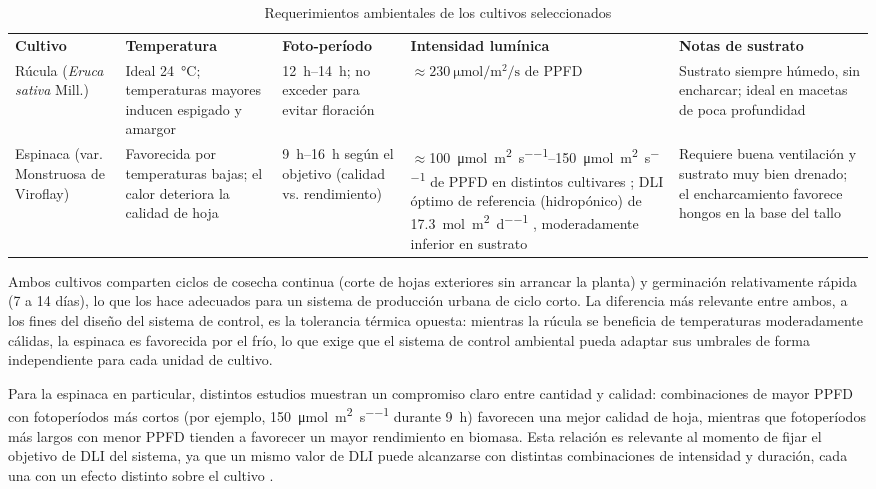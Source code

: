 \begin{table}[H]
\centering
\small
\begin{tabular}{@{}p{2.3cm}p{2.3cm}p{2cm}p{3.5cm}p{3.2cm}@{}}
\textbf{Cultivo} & \textbf{Temperatura} & \textbf{Foto-período} & \textbf{Intensidad lumínica} & \textbf{Notas de sustrato} \\
Rúcula (\textit{Eruca sativa} Mill.) & Ideal \SI{24}{\celsius}; temperaturas mayores inducen espigado y amargor \cite{rucula_mdpi} & \SIrange{12}{14}{\hour}; no exceder para evitar floración & $\approx \SI{230}{\micro\mole\per\square\meter\per\second}$ de PPFD & Sustrato siempre húmedo, sin encharcar; ideal en macetas de poca profundidad \\
\addlinespace
Espinaca (var. Monstruosa de Viroflay) & Favorecida por temperaturas bajas; el calor deteriora la calidad de hoja \cite{espinaca_dli_ouci} & \SIrange{9}{16}{\hour} según el objetivo (calidad vs. rendimiento) \cite{najera2023} & $\approx$\SIrange{100}{150}{\micro\mole\per\square\meter\per\second} de PPFD en distintos cultivares \cite{najera2023}; DLI óptimo de referencia (hidropónico) de \SI{17,3}{\mole\per\square\meter\per\day} \cite{espinaca_dli_ouci}, moderadamente inferior en sustrato & Requiere buena ventilación y sustrato muy bien drenado; el encharcamiento favorece hongos en la base del tallo \\
\end{tabular}

\caption{Requerimientos ambientales de los cultivos seleccionados}
\label{tab:cultivos}

\end{table}

Ambos cultivos comparten ciclos de cosecha continua (corte de hojas exteriores sin arrancar la planta) y germinación relativamente rápida (7 a 14 días), lo que los hace adecuados para un sistema de producción urbana de ciclo corto. La diferencia más relevante entre ambos, a los fines del diseño del sistema de control, es la tolerancia térmica opuesta: mientras la rúcula se beneficia de temperaturas moderadamente cálidas, la espinaca es favorecida por el frío, lo que exige que el sistema de control ambiental pueda adaptar sus umbrales de forma independiente para cada unidad de cultivo.

Para la espinaca en particular, distintos estudios muestran un compromiso claro entre cantidad y calidad: combinaciones de mayor PPFD con fotoperíodos más cortos (por ejemplo, \SI{150}{\micro\mole\per\square\meter\per\second} durante \SI{9}{\hour}) favorecen una mejor calidad de hoja, mientras que fotoperíodos más largos con menor PPFD tienden a favorecer un mayor rendimiento en biomasa. Esta relación es relevante al momento de fijar el objetivo de DLI del sistema, ya que un mismo valor de DLI puede alcanzarse con distintas combinaciones de intensidad y duración, cada una con un efecto distinto sobre el cultivo \cite{najera2023}.

